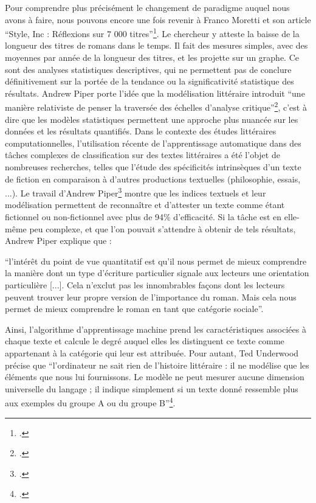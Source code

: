 Pour comprendre plus précisément le changement de paradigme auquel nous avons à faire, nous pouvons encore une fois revenir à Franco Moretti et son article \enquote{Style, Inc : Réflexions sur 7 000 titres}\footcites{moretti_style_2009}. Le chercheur y atteste la baisse de la longueur des titres de romans dans le temps. Il fait des mesures simples, avec des moyennes par année de la longueur des titres, et les projette sur un graphe. Ce sont des analyses statistiques descriptives, qui ne permettent pas de conclure définitivement sur la portée de la tendance ou la significativité statistique des résultats. Andrew Piper porte l'idée que la modélisation littéraire introduit \enquote{une manière relativiste de penser la traversée des échelles d'analyse critique}\footcites{piper_think_2017}, c'est à dire que les modèles statistiques permettent une approche plus nuancée sur les données et les résultats quantifiés.
Dans le contexte des études littéraires computationnelles, l'utilisation récente de l'apprentissage automatique dans des tâches complexes de classification sur des textes littéraires a été l'objet de nombreuses recherches, telles que l'étude des spécificités intrinsèques d'un texte de fiction en comparaison à d'autres productions textuelles (philosophie, essais, ...). Le travail d'Andrew Piper\footcites{piper_fictionality_2016} montre que les indices textuels et leur modélisation permettent de reconnaître et d'attester un texte comme étant fictionnel ou non-fictionnel avec plus de 94\% d'efficacité. Si la tâche est en elle-même peu complexe, et que l'on pouvait s'attendre à obtenir de tels résultats, Andrew Piper explique que :
\begin{displayquote}
\enquote{l'intérêt du point de vue quantitatif est qu'il nous permet de mieux comprendre la manière dont un type d'écriture particulier signale aux lecteurs une orientation particulière [...]. Cela n'exclut pas les innombrables façons dont les lecteurs peuvent trouver leur propre version de l'importance du roman. Mais cela nous permet de mieux comprendre le roman en tant que catégorie sociale}. 
\end{displayquote}

Ainsi, l'algorithme d'apprentissage machine prend les caractéristiques associées à chaque texte et calcule le degré auquel elles les distinguent ce texte comme appartenant à la catégorie qui leur est attribuée. Pour autant, Ted Underwood précise que \enquote{l'ordinateur ne sait rien de l'histoire littéraire : il ne modélise que les éléments que nous lui fournissons. Le modèle ne peut mesurer aucune dimension universelle du langage ; il indique simplement si un texte donné ressemble plus aux exemples du groupe A ou du groupe B}\footcites{underwood_machine_2020}.

